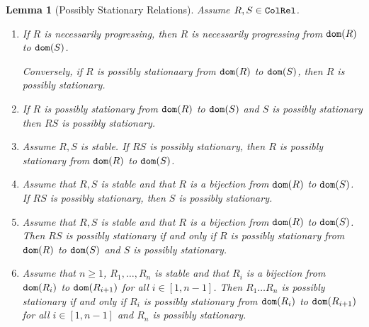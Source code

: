 \documentclass{lmcs}
\newtheorem{lemma}[theorem]{Lemma}
\begin{document}
\begin{lemma}[Possibly Stationary Relations]
\label{lemma-possibly-stationary}
Assume $R, S \in {\tt ColRel}$.

\begin{enumerate}
\item
\label{lemma-possibly-stationary-01}
If $R$ is necessarily progressing, then $R$ is necessarily 
progressing from ${\tt dom}(R)$ to ${\tt dom}(S)$.

Conversely, if $R$ is possibly stationaary from ${\tt dom}(R)$ to ${\tt dom}(S)$, then $R$ is possibly 
stationary.

\item
\label{lemma-possibly-stationary-02}
If $R$ is possibly stationary from ${\tt dom}(R)$ to ${\tt dom}(S)$ and $S$ is possibly stationary
then $RS$ is possibly stationary.

\item
\label{lemma-possibly-stationary-03}
Assume $R, S$ is stable. If $RS$ is possibly stationary, then $R$ is possibly stationary
from ${\tt dom}(R)$ to ${\tt dom}(S)$.

\item
\label{lemma-possibly-stationary-04}
Assume that $R, S$ is stable and that $R$ is a bijection from ${\tt dom}(R)$ to ${\tt dom}(S)$.
If $RS$ is possibly stationary, then $S$ is possibly stationary.

\item
\label{lemma-possibly-stationary-05}
Assume that $R, S$ is stable and that $R$ is a bijection from ${\tt dom}(R)$ to ${\tt dom}(S)$.
Then $RS$ is possibly stationary if and only if $R$ is possibly stationary from ${\tt dom}(R)$ to 
${\tt dom}(S)$ and $S$ is possibly stationary.

\item
\label{lemma-possibly-stationary-06}
Assume that $n \ge 1$, $R_1, \ldots, R_n$ is stable and that $R_i$ is a bijection from ${\tt dom}(R_i)$ 
to ${\tt dom}(R_{i+1})$ for all $i \in [1,n-1]$. 
Then $R_1 \ldots R_n$ is possibly stationary if and only if $R_i$ is possibly stationary
from ${\tt dom}(R_i)$ to ${\tt dom}(R_{i+1})$ for all $i \in [1,n-1]$ and $R_n$ is possibly stationary.
\end{enumerate}
\end{lemma}
\end{document}
